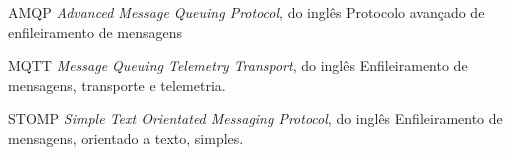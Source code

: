 
\begin{siglas}
    \item[AMQP] \textit{Advanced Message Queuing Protocol}, do inglês Protocolo avançado de enfileiramento de mensagens
    \item[MQTT] \textit{Message Queuing Telemetry Transport}, do inglês Enfileiramento de mensagens, transporte e telemetria.
    \item[STOMP] \textit{Simple Text Orientated Messaging Protocol}, do inglês Enfileiramento de mensagens, orientado a texto, simples.
\end{siglas}

